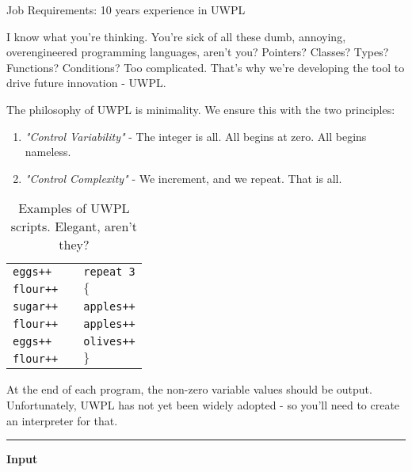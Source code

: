 \togglefalse{IsScore}
{Job Requirements: 10 years experience in UWPL}

I know what you're thinking. You're sick of all these dumb, annoying, overengineered programming languages, aren't you?
Pointers? Classes? Types? Functions? Conditions? Too complicated.
That's why we're developing the tool to drive future innovation - UWPL.

The philosophy of UWPL is minimality. We ensure this with the two principles:
\begin{enumerate}
    \item \textit{"Control Variability"} -
    The integer is all.
    All begins at zero.
    All begins nameless.
    
    \item \textit{"Control Complexity"} - 
    We increment, and we repeat.
    That is all.
\end{enumerate}

\begin{table}[h]
    \centering
    \begin{tabular}{l p{3cm} l}
        \Huge \texttt{eggs\textcolor{uwcsblue}{++}} & & \Huge \texttt{\textcolor{uwcsred}{repeat} 3} \\
        \Huge \texttt{flour\textcolor{uwcsblue}{++}} & & \Huge \texttt{\textcolor{uwcsred}{$\lbrace$}} \\
        \Huge \texttt{sugar\textcolor{uwcsblue}{++}} & & \Huge \texttt{apples\textcolor{uwcsblue}{++}} \\
        \Huge \texttt{flour\textcolor{uwcsblue}{++}} & & \Huge \texttt{apples\textcolor{uwcsblue}{++}} \\
        \Huge \texttt{eggs\textcolor{uwcsblue}{++}} & & \Huge \texttt{olives\textcolor{uwcsblue}{++}} \\
        \Huge \texttt{flour\textcolor{uwcsblue}{++}} & & \Huge \texttt{\textcolor{uwcsred}{$\rbrace$}} \\
    \end{tabular}
    \caption*{Examples of UWPL scripts. Elegant, aren't they?}
\end{table}

At the end of each program, the non-zero variable values should be output.
Unfortunately, UWPL has not yet been widely adopted - so you'll need to create an interpreter for that.

\vspace{8pt}
\hrule

\textbf{Input}

